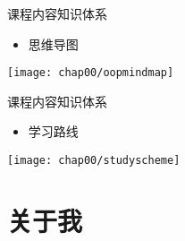 \begin{frame}{课程内容}{知识体系}
  \stretchon
  \begin{itemize}
  \item 思维导图
  \end{itemize}
  \centering
    \texttt{[image: chap00/oopmindmap]} %
  \stretchoff
\end{frame}

\begin{frame}{课程内容}{知识体系}
  \stretchon
  \begin{itemize}
  \item 学习路线
  \end{itemize}
  \centering
  \texttt{[image: chap00/studyscheme]} %
  \stretchoff
\end{frame}

\section[关于我]{关于我}
